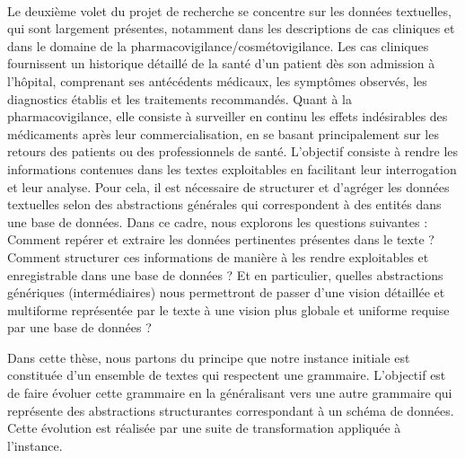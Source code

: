 \begin{example}
\begin{center}
\begin{adjustbox}{max width=\linewidth}
        \end{adjustbox}
    \end{center}
\end{example}

\paragraph{}
Le deuxième volet du projet de recherche se concentre sur les données textuelles, qui sont largement présentes, notamment dans les descriptions de cas cliniques et dans le domaine de la pharmacovigilance/cosmétovigilance.
Les cas cliniques fournissent un historique détaillé de la santé d'un patient dès son admission à l'hôpital, comprenant ses antécédents médicaux, les symptômes observés, les diagnostics établis et les traitements recommandés.
Quant à la pharmacovigilance, elle consiste à surveiller en continu les effets indésirables des médicaments après leur commercialisation, en se basant principalement sur les retours des patients ou des professionnels de santé.
L'objectif consiste à rendre les informations contenues dans les textes exploitables en facilitant leur interrogation et leur analyse.
Pour cela, il est nécessaire de structurer et d'agréger les données textuelles selon des abstractions générales qui correspondent à des entités dans une base de données.
Dans ce cadre, nous explorons les questions suivantes : Comment repérer et extraire les données pertinentes présentes dans le texte ? Comment structurer ces informations de manière à les rendre exploitables et enregistrable dans une base de données ? Et en particulier, quelles abstractions génériques (intermédiaires) nous permettront de passer d'une vision détaillée et multiforme représentée par le texte à une vision plus globale et uniforme requise par une base de données ?

Dans cette thèse, nous partons du principe que notre instance initiale est constituée d'un ensemble de textes qui respectent une grammaire.
L'objectif est de faire évoluer cette grammaire en la généralisant vers une autre grammaire qui représente des abstractions structurantes correspondant à un schéma de données.
Cette évolution est réalisée par une suite de transformation appliquée à l'instance.

